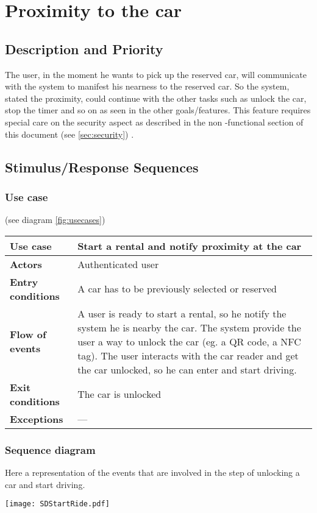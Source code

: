 \documentclass{scrreprt}
\begin{document}
\section{Proximity to the car}
\label{sec:proximity}
\subsection{Description and Priority}
The user, in the moment he wants to pick up the reserved car, will communicate with the system to manifest his nearness to the reserved car. So the system, stated the proximity, could continue with the other tasks such as unlock the car, stop the timer and so on as seen in the other goals/features.
This feature requires special care on the security aspect as described in the non -functional section of this document (see \vref{sec:security}) .
\subsection{Stimulus/Response Sequences}
\subsubsection{Use case}

(see diagram \vref{fig:usecases})

\begin{center}
\begin{tabularx}{\columnwidth}{>{\bfseries}lX}
\toprule
Use case & Start a rental and notify proximity at the car\\
\midrule
Actors & Authenticated user\\
\midrule
Entry conditions & A car has to be previously selected or reserved\\
\midrule
Flow of events & A user is ready to start a rental, so he notify the system he is nearby the car. The system provide the user a way to unlock the car (eg. a QR code, a NFC tag). The user interacts with the car reader and get the car unlocked, so he can enter and start driving.\\
\midrule
Exit conditions & The car is unlocked\\
\midrule
Exceptions & ---\\
\bottomrule
\end{tabularx}
\end{center}

\subsubsection{Sequence diagram}
Here a representation of the events that are involved in the step of unlocking a car and start driving.
\begin{center}
\texttt{[image: SDStartRide.pdf]}
\end{center}
\end{document}
